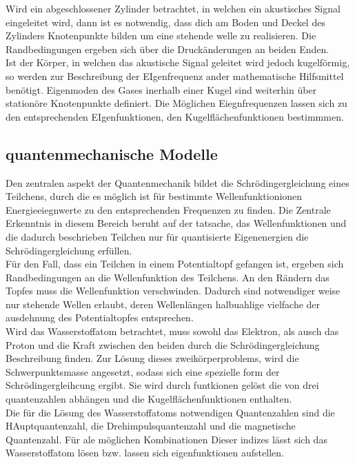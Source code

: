 Wird ein abgeschlossener Zylinder betrachtet, in welchen ein akustisches Signal eingeleitet
wird, dann ist es notwendig, dass dich am Boden und Deckel des Zylinders Knotenpunkte bilden 
um eine stehende welle zu realisieren. Die Randbedingungen ergeben sich über die Druckänderungen 
an beiden Enden.\\

Ist der Körper, in welchen das akustische Signal geleitet wird jedoch kugelförmig, so werden 
zur Beschreibung der EIgenfrequenz ander mathematische Hilfsmittel benötigt.
Eigenmoden des Gases inerhalb einer Kugel sind weiterhin über stationöre Knotenpunkte definiert.
Die Möglichen Eiegnfrequenzen lassen sich zu den entsprechenden EIgenfunktionen, den 
Kugelflächenfunktionen bestimmmen. 

\subsection{quantenmechanische Modelle}
Den zentralen aspekt der Quantenmechanik bildet die Schrödingergleichung eines Teilchens,
durch die es möglich ist für bestimmte Wellenfunktionionen Energieeiegnwerte zu den entsprechenden 
Frequenzen zu finden. Die Zentrale Erkenntnis in diesem Bereich beruht auf  der tatsache, 
das Wellenfunktionen und die dadurch beschrieben Teilchen nur für quantisierte Eigenenergien
die Schrödingergleichung erfüllen.\\

Für den Fall, dass ein Teilchen in einem Potentialtopf gefangen ist, ergeben sich
Randbedingungen an die Wellenfunktion des Teilchens. An den Rändern das Topfes muss die 
Wellenfunktion verschwinden. Dadurch sind notwendiger weise nur stehende Wellen erlaubt, 
deren Wellenlängen halbuahlige vielfache der ausdehnung des Potentialtopfes entsprechen.\\

Wird das Wasserstoffatom betrachtet, muss sowohl das Elektron, als ausch das Proton 
und die Kraft zwischen den beiden durch die Schrödingergleichung Beschreibung finden.
Zur Lösung dieses zweikörperproblems, wird die Schwerpunktsmasse angesetzt, sodass sich eine 
spezielle form der Schrödingergleihcung ergibt. Sie wird durch funtkionen gelöst die von drei 
quantenzahlen abhängen und die Kugelflächenfunktionen enthalten.\\

Die für die Lösung des Wasserstoffatoms notwendigen Quantenzahlen sind die HAuptquantenzahl,
die Drehimpulsquantenzahl und die magnetische Quantenzahl. Für ale möglichen Kombinationen Dieser
indizes lässt sich das Wasserstoffatom lösen bzw. lassen sich eigenfunktionen aufstellen.\\

